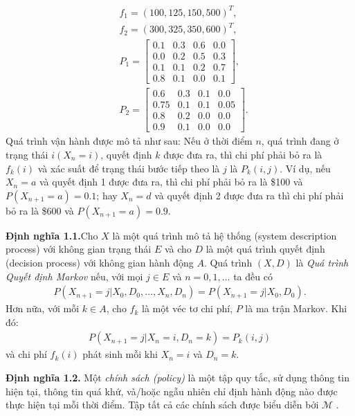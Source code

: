 \documentclass[12pt,a4paper]{report}
\begin{document}
  
 	 \begin{align*}
 	 &f_1=(100,125,150,500)^T,\\
 	 &f_2=(300,325, 350,600)^T,\\
 	 &P_1=\left[
 	 \begin{array}{cccc}
 	 0.1&0.3&0.6&0.0\\
 	 0.0&0.2&0.5&0.3\\
 	 0.1&0.1&0.2&0.7\\
 	 0.8&0.1&0.0&0.1
 	 \end{array}
 	 \right],\\
 	  &P_2=\left[
 	 \begin{array}{cccc}
 	 0.6&0.3&0.1&0.0\\
 	 0.75&0.1&0.1&0.05\\
 	 0.8&0.2&0.0&0.0\\
 	 0.9&0.1&0.0&0.0
 	 \end{array}
 	 \right].
 	 \end{align*} 
 	 Quá trình vận hành được mô tả như sau: Nếu ở thời điểm $n$, quá trình đang ở trạng thái $i (X_n=i)$, quyết định $k$ được đưa ra, thì chi phí phải bỏ ra là $f_k(i)$ và xác suất để trạng thái bước tiếp theo là $j$ là $P_k(i,j)$. Ví dụ, nếu $X_n=a$ và quyết định 1 được đưa ra, thì chi phí phải bỏ ra là \$100 và $P(X_{n+1}=a)=0.1$; hay $X_n=d$ và quyết định 2 được đưa ra thì chi phí phải bỏ ra là \$600 và $P(X_{n+1}=a)=0.9$.
 	  
 	 \medskip
 	 \noindent 	 
 	 \textbf{Định nghĩa 1.1.}Cho $X$ là một quá trình mô tả hệ thống (system description process) với không gian trạng thái $E$ và cho $D$ là một quá trình quyết định (decision process) với không gian hành động $A$. Quá trình $(X,D)$ là
	 \textit{Quá trình Quyết định Markov} nếu, với mọi $j\in E$ và $n=0,1,\dots$ ta đều có
	 \begin{align*}
	 P(X_{n+1}=j|X_0,D_0,\dots,X_n,D_n)=P(X_{n+1}=j|X_0,D_0).
	 \end{align*}
	 Hơn nữa, với mỗi $k\in A$, cho $f_k$ là một véc tơ chi phí, $P$ là ma trận Markov. Khi đó:
	 \begin{align*}
	 P(X_{n+1}=j|X_n=i, D_n=k)=P_k(i,j)
	 \end{align*}
	 và chi phí $f_k(i)$ phát sinh mỗi khi $X_n=i$ và $D_n=k$.
	 
	 \medskip
	 \noindent
	 \textbf{Định nghĩa 1.2.} Một \textit{chính sách (policy)} là một tập quy tắc, sử dụng thông tin hiện tại, thông tin quá khứ, và/hoặc ngẫu nhiên chỉ định hành động nào được thực hiện tại mỗi thời điểm. Tập tất cả các chính sách được biểu diễn bởi  $\mathcal{M}$ .
	 
\end{document}
